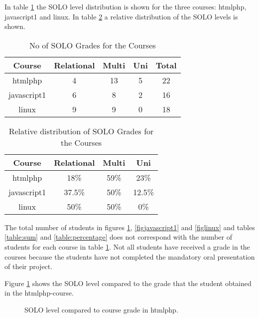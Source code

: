 \documentclass[twoside,twocolumn,a4paper,11pt,english]{article}
\begin{document}
In table \ref{table:solo} the SOLO level distribution is shown for the three courses: htmlphp, javascript1 and linux. In table \ref{table:solorelative} a relative distribution of the SOLO levels is shown.

\begin{table}[H]
\caption{No of SOLO Grades for the Courses}
\centering
\begin{tabular}{c | c c c | c}
Course & Relational & Multi & Uni & Total  \\ [0.5ex] %
\hline
htmlphp & 4 & 13 & 5 & 22 \\
javascript1 & 6 & 8 & 2 & 16\\
linux & 9 & 9 & 0 & 18 \\
\end{tabular}
\label{table:solo}
\end{table}

\begin{table}[H]
\caption{Relative distribution of SOLO Grades for the Courses}
\centering
\begin{tabular}{c | c c c}
Course & Relational & Multi & Uni \\ [0.5ex] %
\hline
htmlphp & 18\% & 59\% & 23\% \\
javascript1 & 37.5\% & 50\% & 12.5\%\\
linux & 50\% & 50\% & 0\%\\ [1ex]
\end{tabular}
\label{table:solorelative}
\end{table}

The total number of students in figures \ref{fightmlphp}, \ref{figjavascript1} and \ref{figlinux} and tables \ref{table:sum} and \ref{table:percentage} does not correspond with the number of students for each course in table \ref{table:solo}. Not all students have received a grade in the courses because the students have not completed the mandatory oral presentation of their project.

Figure \ref{fightmlphp} shows the SOLO level compared to the grade that the student obtained in the htmlphp-course.

\begin{figure}[H]
\caption{SOLO level compared to course grade in htmlphp.}
\label{fightmlphp}
\end{figure}
\end{document}

